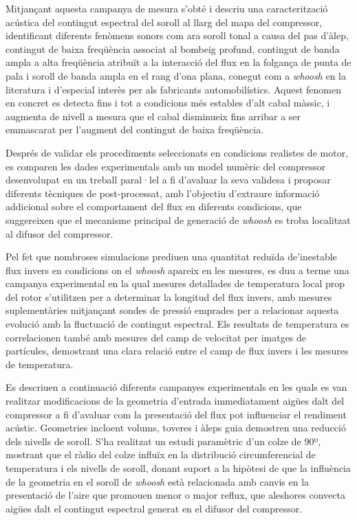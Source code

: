 Mitjançant aquesta campanya de mesura s'obté i descriu una caracterització acústica del contingut espectral del soroll al llarg del mapa del compressor, identificant diferents fenòmens sonors com ara soroll tonal a causa del pas d'àlep, contingut de baixa freqüència associat al bombeig profund, contingut de banda ampla a alta freqüència atribuït a la interacció del flux en la folgança de punta de pala i soroll de banda ampla en el rang d'ona plana, conegut com a \emph{whoosh} en la literatura i d'especial interès per als fabricants automobilístics. Aquest fenomen en concret es detecta fins i tot a condicions més estables d'alt cabal màssic, i augmenta de nivell a mesura que el cabal disminueix fins arribar a ser emmascarat per l'augment del contingut de baixa freqüència.

Després de validar els procediments seleccionats en condicions realistes de motor, es comparen les dades experimentals amb un model numèric del compressor desenvolupat en un treball paral·lel a fi d'avaluar la seva validesa i proposar diferents tècniques de post-processat, amb l'objectiu d'extraure informació addicional sobre el comportament del flux en diferents condicions, que suggereixen que el mecanisme principal de generació de \emph{whoosh} es troba localitzat al difusor del compressor.

Pel fet que nombroses simulacions prediuen una quantitat reduïda de'i\-nes\-ta\-ble flux invers en condicions on el \emph{whoosh} apareix en les mesures, es duu a terme una campanya experimental en la qual mesures detallades de temperatura local prop del rotor s'utilitzen per a determinar la longitud del flux invers, amb mesures suplementàries mitjançant sondes de pressió emprades per a relacionar aquesta evolució amb la fluctuació de contingut espectral. Els resultats de temperatura es correlacionen també amb mesures del camp de velocitat per imatges de partícules, demostrant una clara relació entre el camp de flux invers i les mesures de temperatura.

Es descriuen a continuació diferents campanyes experimentals en les quals es van realitzar modificacions de la geometria d'entrada immediatament aigües dalt del compressor a fi d'avaluar com la presentació del flux pot influenciar el rendiment acústic. Geometries incloent volums, toveres i àleps guia demostren una reducció dels nivells de soroll. S'ha realitzat un estudi paramètric d'un colze de 90º, mostrant que el ràdio del colze influïx en la distribució circumferencial de temperatura i els nivells de soroll, donant suport a la hipòtesi de que la influència de la geometria en el soroll de \emph{whoosh} està relacionada amb canvis en la presentació de l'aire que promouen menor o major reflux, que aleshores convecta aigües dalt el contingut espectral generat en el difusor del compressor.

\cleardoublepage